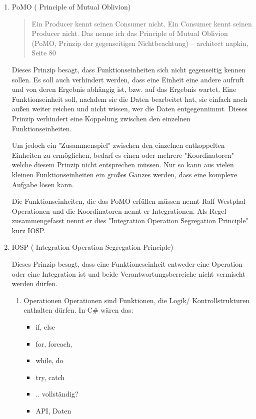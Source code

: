 \documentclass[11pt]{article}
\begin{document}
\begin{enumerate}
\item PoMO ( Principle of Mutual Oblivion)
\label{sec:orgheadline19}
\begin{quote}
Ein Producer kennt seinen Consumer nicht. Ein Consumer kennt seinen Producer
nicht. Das nenne ich das Principle of Mutual Oblivion (PoMO,
Prinzip der gegenseitigen Nichtbeachtung) -- architect napkin, Seite 80
\end{quote}

Dieses Prinzip besagt, dass Funktionseinheiten sich nicht gegenseitig kennen sollen.
Es soll auch verhindert werden, dass eine Einheit eine andere aufruft und von deren Ergebnis
abhängig ist, bzw. auf das Ergebnis wartet.
Eine Funktionseinheit soll, nachdem sie die Daten bearbeitet hat, sie einfach nach
außen weiter reichen und nicht wissen, wer die Daten entgegennimmt.
Dieses Prinzip verhindert eine Koppelung zwischen den einzelnen Funktionseinheiten.

Um jedoch ein "Zusammenspiel" zwischen den einzelnen entkoppelten Einheiten zu ermöglichen, bedarf es einen oder
mehrere "Koordinatoren" welche diesem Prinzip nicht entsprechen müssen.
Nur so kann aus vielen kleinen Funktionseinheiten ein großes Ganzes werden, dass eine komplexe Aufgabe lösen kann.

Die Funktionseinheiten, die das PoMO erfüllen müssen nennt Ralf Westphal Operationen und die Koordinatoren nennt er
Integrationen. Als Regel zusammengefasst nennt er dies "Integration Operation Segregation Principle" kurz IOSP.


\item IOSP ( Integration Operation Segregation Principle)
\label{sec:orgheadline22}

Dieses Prinzip besagt, dass eine Funktioneseinheit entweder eine Operation oder eine Integration ist und beide
Verantwortungsberreiche nicht vermischt werden dürfen.

\begin{enumerate}
\item Operationen
\label{sec:orgheadline20}
Operationen sind Funktionen, die Logik/ Kontrollstrukturen enthalten dürfen. In C\# wären das:
\begin{itemize}
\item if, else
\item for, foreach,
\item while, do
\item try, catch
\item .. vollständig?
\item API, Daten
\end{itemize}




\end{enumerate}
\end{enumerate}
\end{document}

